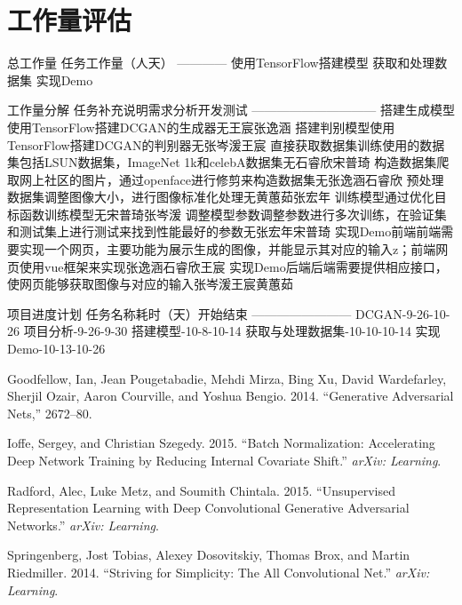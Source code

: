 \documentclass[
  hyperref, a4paper]{ctexart}
\newlength{\cslhangindent}
\newenvironment{cslreferences}%
  {\setlength{\parindent}{0pt}%
  \everypar{\setlength{\hangindent}{\cslhangindent}}\ignorespaces}%
  {\par}
\begin{document}
\hypertarget{ux5de5ux4f5cux91cfux8bc4ux4f30}{%
\section{工作量评估}\label{ux5de5ux4f5cux91cfux8bc4ux4f30}}

总工作量 任务\textbar 工作量（人天） ------\textbar------
使用TensorFlow搭建模型 获取和处理数据集
实现Demo

工作量分解
任务\textbar 补充说明\textbar 需求分析\textbar 开发\textbar 测试
------\textbar------\textbar------\textbar------\textbar------
搭建生成模型\textbar 使用TensorFlow搭建DCGAN的生成器\textbar 无\textbar 王宸\textbar 张逸涵
搭建判别模型\textbar 使用TensorFlow搭建DCGAN的判别器\textbar 无\textbar 张岑湲\textbar 王宸
直接获取数据集\textbar 训练使用的数据集包括LSUN数据集，ImageNet
1k和celebA数据集\textbar 无\textbar 石睿欣\textbar 宋普琦
构造数据集\textbar 爬取网上社区的图片，通过openface进行修剪来构造数据集\textbar 无\textbar 张逸涵\textbar 石睿欣
预处理数据集\textbar 调整图像大小，进行图像标准化处理\textbar 无\textbar 黄蕙茹\textbar 张宏年
训练模型\textbar 通过优化目标函数训练模型\textbar 无\textbar 宋普琦\textbar 张岑湲
调整模型参数\textbar 调整参数进行多次训练，在验证集和测试集上进行测试来找到性能最好的参数\textbar 无\textbar 张宏年\textbar 宋普琦
实现Demo前端\textbar 前端需要实现一个网页，主要功能为展示生成的图像，并能显示其对应的输入z；前端网页使用vue框架来实现\textbar 张逸涵\textbar 石睿欣\textbar 王宸
实现Demo后端\textbar 后端需要提供相应接口，使网页能够获取图像与对应的输入\textbar 张岑湲\textbar 王宸\textbar 黄蕙茹

项目进度计划 任务名称\textbar 耗时（天）\textbar 开始\textbar 结束
------\textbar------\textbar------\textbar------
DCGAN-9-26-10-26
项目分析-9-26-9-30
搭建模型-10-8-10-14
获取与处理数据集-10-10-10-14
实现Demo-10-13-10-26

\hypertarget{refs}{}
\begin{cslreferences}
\leavevmode\hypertarget{ref-goodfellow2014generative}{}%
Goodfellow, Ian, Jean Pougetabadie, Mehdi Mirza, Bing Xu, David
Wardefarley, Sherjil Ozair, Aaron Courville, and Yoshua Bengio. 2014.
``Generative Adversarial Nets,'' 2672--80.

\leavevmode\hypertarget{ref-ioffe2015batch}{}%
Ioffe, Sergey, and Christian Szegedy. 2015. ``Batch Normalization:
Accelerating Deep Network Training by Reducing Internal Covariate
Shift.'' \emph{arXiv: Learning}.

\leavevmode\hypertarget{ref-radford2015unsupervised}{}%
Radford, Alec, Luke Metz, and Soumith Chintala. 2015. ``Unsupervised
Representation Learning with Deep Convolutional Generative Adversarial
Networks.'' \emph{arXiv: Learning}.

\leavevmode\hypertarget{ref-springenberg2014striving}{}%
Springenberg, Jost Tobias, Alexey Dosovitskiy, Thomas Brox, and Martin
Riedmiller. 2014. ``Striving for Simplicity: The All Convolutional
Net.'' \emph{arXiv: Learning}.
\end{cslreferences}
\end{document}
